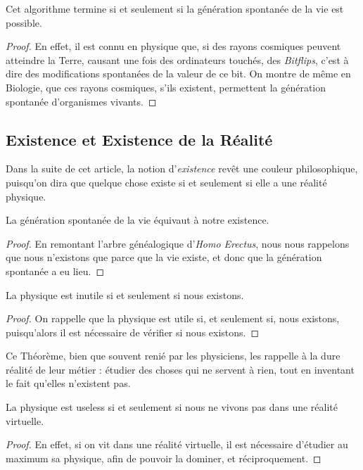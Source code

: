 \documentclass{cours}
\begin{document}
\begin{lemma}\label{GS-MSort}
    Cet algorithme termine si et seulement si la génération spontanée de la vie est possible. 
\end{lemma}
\begin{proof}
    En effet, il est connu en physique que, si des rayons cosmiques peuvent atteindre la Terre, causant une fois des ordinateurs touchés, des \textit{Bitflips}, c'est à dire des modifications spontanées de la valeur de ce bit. On montre de même en Biologie, que ces rayons cosmiques, s'ils existent, permettent la génération spontanée d'organismes vivants.
\end{proof}

\subsection{Existence et Existence de la Réalité}
\begin{definition}
    Dans la suite de cet article, la notion d'\emph{existence} revêt une couleur philosophique, puisqu'on dira que quelque chose existe si et seulement si elle a une réalité physique.
\end{definition}
\begin{lemma}\label{gsexist}
    La génération spontanée de la vie équivaut à notre existence.
\end{lemma}
\begin{proof}
    En remontant l'arbre généalogique d'\textsl{Homo Erectus}, nous nous rappelons que nous n'existons que parce que la vie existe, et donc que la génération spontanée a eu lieu.
\end{proof}

\begin{lemma}\label{phyuseless}
    La physique est inutile si et seulement si nous existons.
\end{lemma}
\begin{proof}
    On rappelle que la physique est utile si, et seulement si, nous existons, puisqu'alors il est nécessaire de vérifier si nous existons. 
\end{proof}
\begin{remark}
    Ce Théorème, bien que souvent renié par les physiciens, les rappelle à la dure réalité de leur métier : étudier des choses qui ne servent à rien, tout en inventant le fait qu'elles n'existent pas. 
\end{remark}

\begin{lemma}\label{novr}
    La physique est useless si et seulement si nous ne vivons pas dans une réalité virtuelle.
\end{lemma}
\begin{proof}
    En effet, si on vit dans une réalité virtuelle, il est nécessaire d'étudier au maximum sa physique, afin de pouvoir la dominer, et réciproquement. 
\end{proof}
\end{document}
